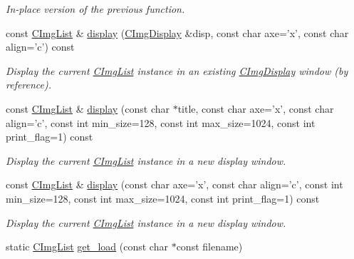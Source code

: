 \begin{DoxyCompactItemize}
\begin{DoxyCompactList}\small\item\em In-\/place version of the previous function. \end{DoxyCompactList}\item 
const \hyperlink{structcimg__library_1_1_c_img_list}{C\-Img\-List} \& \hyperlink{structcimg__library_1_1_c_img_list_a2614afd15e45653cbeb6d3626c7492b3}{display} (\hyperlink{structcimg__library_1_1_c_img_display}{C\-Img\-Display} \&disp, const char axe='x', const char align='c') const 
\begin{DoxyCompactList}\small\item\em Display the current \hyperlink{structcimg__library_1_1_c_img_list}{C\-Img\-List} instance in an existing \hyperlink{structcimg__library_1_1_c_img_display}{C\-Img\-Display} window (by reference). \end{DoxyCompactList}\item 
const \hyperlink{structcimg__library_1_1_c_img_list}{C\-Img\-List} \& \hyperlink{structcimg__library_1_1_c_img_list_a7346f53f857c5c9f3d30928c7f3f6238}{display} (const char $\ast$title, const char axe='x', const char align='c', const int min\-\_\-size=128, const int max\-\_\-size=1024, const int print\-\_\-flag=1) const 
\begin{DoxyCompactList}\small\item\em Display the current \hyperlink{structcimg__library_1_1_c_img_list}{C\-Img\-List} instance in a new display window. \end{DoxyCompactList}\item 
const \hyperlink{structcimg__library_1_1_c_img_list}{C\-Img\-List} \& \hyperlink{structcimg__library_1_1_c_img_list_a4836df295ddebfcd48a35613977fb0f9}{display} (const char axe='x', const char align='c', const int min\-\_\-size=128, const int max\-\_\-size=1024, const int print\-\_\-flag=1) const 
\begin{DoxyCompactList}\small\item\em Display the current \hyperlink{structcimg__library_1_1_c_img_list}{C\-Img\-List} instance in a new display window. \end{DoxyCompactList}\item 
\hypertarget{structcimg__library_1_1_c_img_list_a1caed2cc618a174e8ab6fb418eee02d9}{static \hyperlink{structcimg__library_1_1_c_img_list}{C\-Img\-List} \hyperlink{structcimg__library_1_1_c_img_list_a1caed2cc618a174e8ab6fb418eee02d9}{get\-\_\-load} (const char $\ast$const filename)}\label{structcimg__library_1_1_c_img_list_a1caed2cc618a174e8ab6fb418eee02d9}


\end{DoxyCompactItemize}
